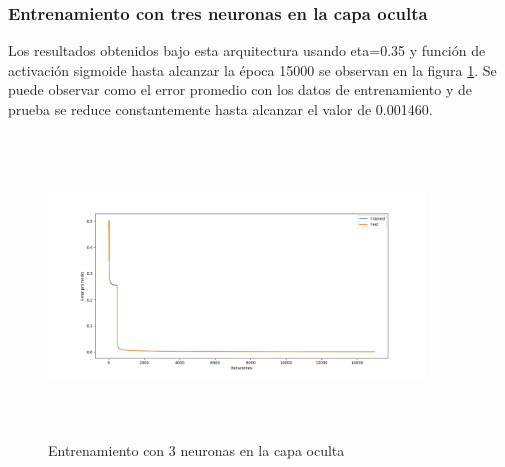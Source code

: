 \documentclass[11pt]{article}
\begin{document}
\subsubsection{Entrenamiento con tres neuronas en la capa oculta}
Los resultados obtenidos bajo esta arquitectura usando eta=0.35 y funci\'on de activaci\'on sigmoide
hasta alcanzar la \'epoca 15000 se observan en la figura \ref{fig:result_3hn}. Se puede observar como el error promedio con los datos de entrenamiento y de prueba
se reduce constantemente hasta alcanzar el valor de 0.001460.
\begin{figure}[H]
    \includegraphics[width=10cm, height=8cm]{result_3hn}
    \centering
    \caption{Entrenamiento con 3 neuronas en la capa oculta}
    \label{fig:result_3hn}
\end{figure}
\end{document}
